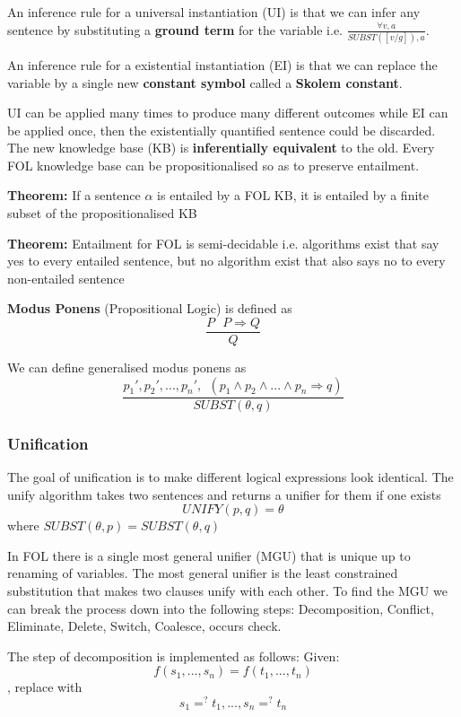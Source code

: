 \documentclass{article}
\begin{document}
An inference rule for a universal instantiation (UI) is that we can infer any sentence by substituting a \textbf{ground term} for the variable i.e. $\frac{\forall v, a}{SUBST([v/g]),a}$. 

An inference rule for a existential instantiation (EI) is that we can replace the variable by a single new \textbf{constant symbol} called a \textbf{Skolem constant}. 

UI can be applied many times to produce many different outcomes while EI can be applied once, then the existentially quantified sentence could be discarded. The new knowledge base (KB) is \textbf{inferentially equivalent} to the old. Every FOL knowledge base can be propositionalised so as to preserve entailment. \newline

\textbf{Theorem:} If a sentence $\alpha$ is entailed by a FOL KB, it is entailed by a finite subset of the propositionalised KB \newline

\textbf{Theorem:} Entailment for FOL is semi-decidable i.e. algorithms exist that say yes to every entailed sentence, but no algorithm exist that also says no to every non-entailed sentence

\textbf{Modus Ponens} (Propositional Logic) is defined as $$\frac{P \: \: \: P \Rightarrow Q}{Q}$$

We can define generalised modus ponens as $$\frac{p_1', p_2',...,p_n', \: \: (p_1 \wedge p_2 \wedge ... \wedge p_n \Rightarrow q)}{SUBST(\theta, q)}$$

\subsubsection{Unification}

The goal of unification is to make different logical expressions look identical. The unify algorithm takes two sentences and returns a unifier for them if one exists $$UNIFY(p, q) = \theta$$ where $SUBST(\theta, p) = SUBST(\theta, q)$

In FOL there is a single most general unifier (MGU) that is unique up to renaming of variables. The most general unifier is the least constrained substitution that makes two clauses unify with each other. To find the MGU we can break the process down into the following steps: Decomposition, Conflict, Eliminate, Delete, Switch, Coalesce, occurs check. 

The step of decomposition is implemented as follows: \newline
Given: $$f(s_1,...,s_n) = f(t_1,...,t_n)$$, replace with $$s_1 =^? t_1,...,s_n =^? t_n$$
\end{document}
